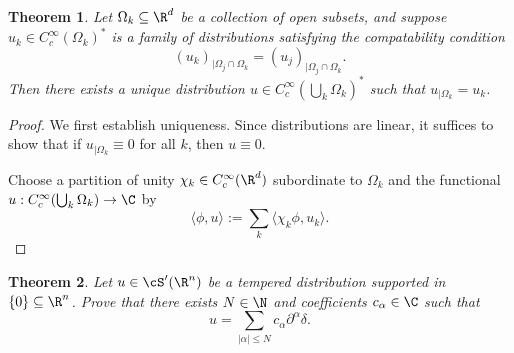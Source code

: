 \documentclass[reqno]{amsart}
\newtheorem{theorem}{Theorem}
\theoremstyle{definition}
\theoremstyle{remark}
\begin{document}
\begin{theorem}
	Let $\Omega_k \subseteq \R^d$ be a collection of open subsets, and suppose $u_k \in C^\infty_c (\Omega_k)^*$ is a family of distributions satisfying the compatability condition 
		\[ (u_k)_{|\Omega_j \cap \Omega_k} = (u_j)_{|\Omega_j \cap \Omega_k}. \]
	Then there exists a unique distribution $u \in C^\infty_c (\bigcup_k \Omega_k)^*$ such that $u_{|\Omega_k} = u_k$.	
\end{theorem}

\begin{proof}
	

	We first establish uniqueness. Since distributions are linear, it suffices to show that if $u_{|\Omega_k} \equiv 0$ for all $k$, then $u \equiv 0$. 
	
	

	Choose a partition of unity $\chi_k \in C^\infty_c (\R^d)$ subordinate to $\Omega_k$ and the functional $u: C^\infty_c (\bigcup_k \Omega_k) \to \C$ by 
		\[ \langle \phi, u \rangle := \sum_k \langle \chi_k \phi, u_k \rangle.  \]
		
\end{proof}

\begin{theorem}
	Let $u \in \cS' (\R^n)$ be a tempered distribution supported in $\{0\} \subseteq \R^n$. Prove that there exists $N \in \N$ and coefficients $c_\alpha \in \C$ such that 
		\[ u = \sum_{|\alpha| \leq N} c_\alpha \partial^\alpha \delta. \]
\end{theorem}
\end{document}
